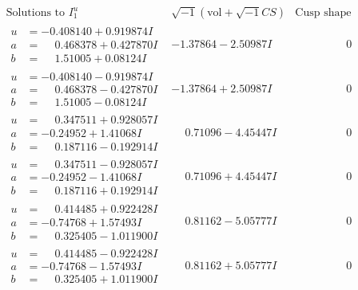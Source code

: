 \documentclass[1p]{elsarticle_modified}
\theoremstyle{definition}
\newcommand{\I}{\sqrt{-1}}
\begin{document}
$$\begin{array}{c|c|c}  
\text{Solutions to }I^u_{1}& \I (\text{vol} + \sqrt{-1}CS) & \text{Cusp shape}\\
 \hline 
\begin{aligned}
u &= -0.408140 + 0.919874 I \\
a &= \phantom{-}0.468378 + 0.427870 I \\
b &= \phantom{-}1.51005 + 0.08124 I\end{aligned}
 & -1.37864 - 2.50987 I & \phantom{-0.000000 } 0 \\ \hline\begin{aligned}
u &= -0.408140 - 0.919874 I \\
a &= \phantom{-}0.468378 - 0.427870 I \\
b &= \phantom{-}1.51005 - 0.08124 I\end{aligned}
 & -1.37864 + 2.50987 I & \phantom{-0.000000 } 0 \\ \hline\begin{aligned}
u &= \phantom{-}0.347511 + 0.928057 I \\
a &= -0.24952 + 1.41068 I \\
b &= \phantom{-}0.187116 - 0.192914 I\end{aligned}
 & \phantom{-}0.71096 - 4.45447 I & \phantom{-0.000000 } 0 \\ \hline\begin{aligned}
u &= \phantom{-}0.347511 - 0.928057 I \\
a &= -0.24952 - 1.41068 I \\
b &= \phantom{-}0.187116 + 0.192914 I\end{aligned}
 & \phantom{-}0.71096 + 4.45447 I & \phantom{-0.000000 } 0 \\ \hline\begin{aligned}
u &= \phantom{-}0.414485 + 0.922428 I \\
a &= -0.74768 + 1.57493 I \\
b &= \phantom{-}0.325405 - 1.011900 I\end{aligned}
 & \phantom{-}0.81162 - 5.05777 I & \phantom{-0.000000 } 0 \\ \hline\begin{aligned}
u &= \phantom{-}0.414485 - 0.922428 I \\
a &= -0.74768 - 1.57493 I \\
b &= \phantom{-}0.325405 + 1.011900 I\end{aligned}
 & \phantom{-}0.81162 + 5.05777 I & \phantom{-0.000000 } 0 \\ \hline\begin{aligned}

\end{aligned}
\end{array}$$
\end{document}
